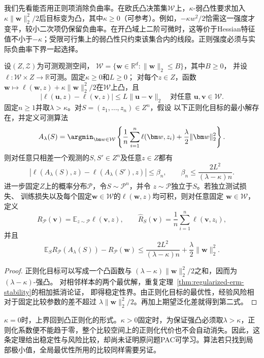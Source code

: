 我们先看能否用正则项消除负曲率。在欧氏凸决策集$\mathcal W$上，$\kappa$-弱凸性要求加入$\kappa\|\bm w\|_2^2/2$后目标变为凸，其中$\kappa\geq0$（可参考）。例如，$-\kappa w^2/2$恰需这一强度才变平，较小二次项仍保留负曲率。在开凸域上二阶可微时，这等价于Hessian特征值不小于$-\kappa$；受限可行集上的弱凸性只约束该集合内的线段。正则强度必须与实际负曲率下界一起选择。
\label{def:weakly-convex}
\begin{theorem}[弱凸损失的正则化稳定性]
\label{thm:weakly-convex-regularization}
设$(Z,\mathcal Z)$为可测观测空间，
$\mathcal W=\{\bm w\in\mathbb R^d:\|\bm w\|_2\leq B\}$，其中$B\geq0$，
并设$\ell:\mathcal W\times Z\to\mathbb R$可测。固定$\kappa\geq0$和$L\geq0$；
对每个$z\in Z$，函数
$\bm w\mapsto\ell(\bm w,z)+\kappa\|\bm w\|_2^2/2$在$\mathcal W$上凸，且
\[
 |\ell(\bm u,z)-\ell(\bm v,z)|\leq L\|\bm u-\bm v\|_2
 \quad\text{对任意 }\bm u,\bm v\in\mathcal W.
\]
固定$n\geq1$并取$\lambda>\kappa$。对$S=(z_1,\ldots,z_n)\in Z^n$，假设
以下正则化目标的最小解存在，并定义可测算法
\[
 A_\lambda(S)=\argmin_{\bm w\in\mathcal W}
 \left\{\frac1n\sum_{i=1}^n\ell(\bm w,z_i)
 +\frac\lambda2\|\bm w\|_2^2\right\}.
\]
则对任意只相差一个观测的$S,S'\in Z^n$及任意$z\in Z$都有
\[
 |\ell(A_\lambda(S),z)-\ell(A_\lambda(S'),z)|
 \leq\beta_n,\qquad
 \beta_n\leq\frac{2L^2}{(\lambda-\kappa)n}.
\]
进一步固定$Z$上的概率分布$\mathcal P$，令$S\sim\mathcal P^n$，并令
$z\sim\mathcal P$独立于$S$。若独立测试损失、
训练损失以及每个固定$\bm w\in\mathcal W$的$\ell(\bm w,z)$均可积，则对任意固定
$\bm w\in\mathcal W$，定义
\[
 R_{\mathcal P}(\bm v)=\mathbb E_{z\sim\mathcal P}\ell(\bm v,z),
 \qquad
 \hat R_S(\bm v)=\frac1n\sum_{i=1}^n\ell(\bm v,z_i),
\]
并且
\[
 \mathbb E_S R_{\mathcal P}(A_\lambda(S))-R_{\mathcal P}(\bm w)
 \leq\frac{2L^2}{(\lambda-\kappa)n}+\frac\lambda2\|\bm w\|_2^2.
\]
\end{theorem}
\begin{proof}
正则化目标可以写成一个凸函数与
$(\lambda-\kappa)\|\bm w\|_2^2/2$之和，因而为$(\lambda-\kappa)$-强凸。
对相邻样本的两个最优解，重复定理~\ref{thm:regularized-erm-stability}的相加抵消论证，
即得稳定性界。由正则化目标的最优性，经验风险相对于固定比较参数的差不超过
$\lambda\|\bm w\|_2^2/2$。再加上期望泛化差就得到第二式。
\end{proof}

$\kappa=0$时，上界回到凸正则化的形式。$\kappa>0$固定时，为保证强凸必须取$\lambda>\kappa$，正则化系数便不能趋于零，整个比较空间上的正则化代价也不会自动消失。因此，这条定理给出稳定性与风险比较，却尚未证明原问题PAC可学习。算法若只找到局部极小值，全局最优性所用的比较同样需要另证。

